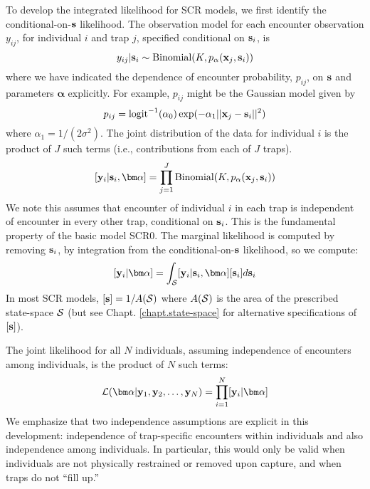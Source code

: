  To develop the integrated
likelihood for SCR models, we first identify the conditional-on-${\bf s}$
likelihood. 
The observation model for each encounter observation $y_{ij}$, for
individual $i$ and trap $j$,
specified conditional on ${\bf s}_{i}$, is 
\begin{equation}
y_{ij}| {\bf s}_{i} \sim \mbox{Binomial}(K, p_{\alpha}({\bf x}_{j},{\bf s}_{i}))
\label{mle.eq.cond-on-s}
\end{equation}
where we have indicated the dependence of encounter probability, $p_{ij}$, on ${\bf s}$ and
parameters ${\bm \alpha}$
explicitly. For example, $p_{ij}$ might be the Gaussian model given by
\[
 p_{ij} = \mbox{logit}^{-1}(\alpha_{0})\exp( -\alpha_{1} ||{\bf x}_{j} - {\bf s}_{i}||^{2})
\]
where $\alpha_{1} = 1/(2\sigma^2)$.
The joint distribution of the data for individual $i$ is the product
of $J$ such terms (i.e., contributions from each of $J$ traps).
\[
  [{\bf y}_{i} | {\bf s}_{i} , {\bm \alpha}] = 
  \prod_{j=1}^{J} \mbox{Binomial}(K, p_{\alpha}({\bf x}_{j},{\bf s}_{i}) )
\]
We note this assumes that encounter of individual $i$ in each
trap is independent of encounter in every other trap, conditional on
${\bf s}_{i}$. This is the fundamental property of the basic model SCR0.
The marginal likelihood is computed by removing
${\bf s}_{i}$, by integration from the conditional-on-${\bf s}$
likelihood, so we compute:
\[
  [{\bf y}_{i}|{\bm \alpha}] = 
\int_{{\cal S}}  [ {\bf y}_{i} |{\bf s}_{i}, {\bm \alpha}] [{\bf s}_{i}] d{\bf s}_{i}
\]
In most SCR models, $[{\bf s}] = 1/A({\cal S})$ where $A({\cal S})$ is
the area of the prescribed state-space ${\cal S}$ (but see Chapt. \ref{chapt.state-space} for
alternative specifications of $[{\bf s}]$).

The joint likelihood for all $N$ individuals, assuming independence of
encounters among individuals, is the product of $N$ such terms:
\[
{\cal L}({\bm \alpha} | {\bf y}_{1},{\bf y}_{2},\ldots, {\bf y}_{N}) =     \prod_{i=1}^{N}
[{\bf y}_{i}|{\bm \alpha}]
\]
We emphasize that two independence assumptions are explicit in this
development: independence of trap-specific encounters within
individuals and also independence among individuals. In particular,
this would only be valid when individuals are not physically
restrained or removed upon capture, and when traps do not ``fill up.''


